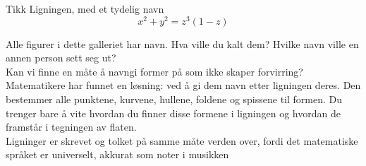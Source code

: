 \begin{surferPage}{Tikk}
Ligningen, med et tydelig navn \\
\smallskip
\[x^2 + y^2	= z^3	(1 - z) \]


\singlespacing
Alle figurer i dette galleriet har navn. Hva ville du kalt dem? Hvilke navn ville en annen person sett seg ut?\\
\vspace{0.3cm}
Kan vi finne en måte å navngi former på som ikke skaper forvirring? Matematikere har funnet en løsning: ved å gi dem navn etter ligningen deres. Den bestemmer alle punktene, kurvene, hullene, foldene og spissene til formen. Du trenger bare å vite hvordan du finner disse formene i ligningen og hvordan de framstår i tegningen av flaten.\\
\vspace{0.3cm}
Ligninger er skrevet og tolket på samme måte verden over, fordi det matematiske språket er universelt, akkurat som noter i musikken
\end{surferPage}
